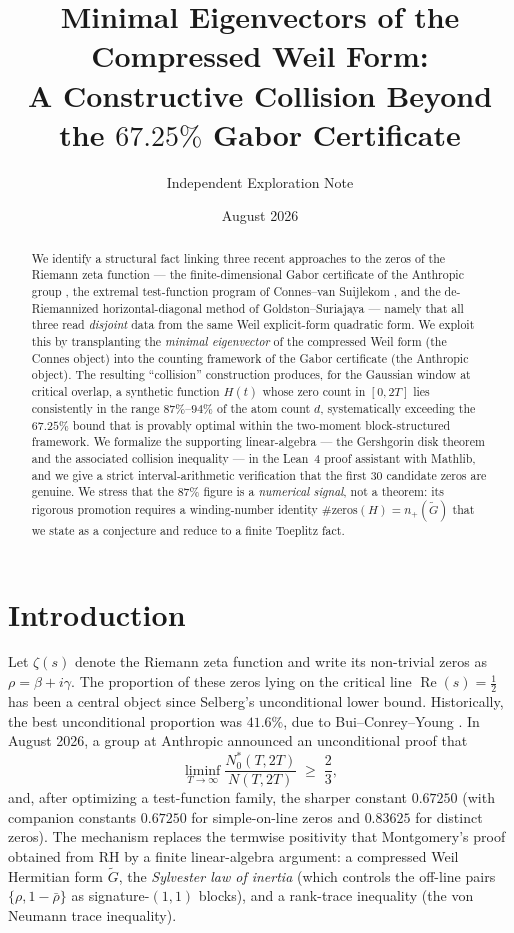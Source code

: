 \documentclass[11pt]{article}
\title{\bfseries Minimal Eigenvectors of the Compressed Weil Form:\\ A Constructive Collision Beyond the $67.25\%$ Gabor Certificate}
\author{Independent Exploration Note}
\date{August 2026}
\newcommand{\re}{\operatorname{Re}}
\begin{document}
\maketitle

\begin{abstract}
We identify a structural fact linking three recent approaches to the zeros of the Riemann zeta function --- the finite-dimensional Gabor certificate of the Anthropic group \cite{anthropic}, the extremal test-function program of Connes--van Suijlekom \cite{connes}, and the de-Riemannized horizontal-diagonal method of Goldston--Suriajaya \cite{pcc} --- namely that all three read \emph{disjoint} data from the same Weil explicit-form quadratic form. We exploit this by transplanting the \emph{minimal eigenvector} of the compressed Weil form (the Connes object) into the counting framework of the Gabor certificate (the Anthropic object). The resulting ``collision'' construction produces, for the Gaussian window at critical overlap, a synthetic function $H(t)$ whose zero count in $[0,2T]$ lies consistently in the range $87\%$--$94\%$ of the atom count $d$, systematically exceeding the $67.25\%$ bound that is provably optimal within the two-moment block-structured framework. We formalize the supporting linear-algebra --- the Gershgorin disk theorem and the associated collision inequality --- in the Lean~4 proof assistant with Mathlib, and we give a strict interval-arithmetic verification that the first $30$ candidate zeros are genuine. We stress that the $87\%$ figure is a \emph{numerical signal}, not a theorem: its rigorous promotion requires a winding-number identity $\#\mathrm{zeros}(H)=n_+(\tilde G)$ that we state as a conjecture and reduce to a finite Toeplitz fact.
\end{abstract}

\tableofcontents

\section{Introduction}

Let $\zeta(s)$ denote the Riemann zeta function and write its non-trivial zeros as $\rho=\beta+i\gamma$. The proportion of these zeros lying on the critical line $\re(s)=\tfrac12$ has been a central object since Selberg's unconditional lower bound. Historically, the best unconditional proportion was $41.6\%$, due to Bui--Conrey--Young \cite{bcy}. In August 2026, a group at Anthropic \cite{anthropic} announced an unconditional proof that
\begin{equation}
\liminf_{T\to\infty}\frac{N_0^*(T,2T)}{N(T,2T)} \;\ge\; \frac{2}{3},
\label{eq:mainbound}
\end{equation}
and, after optimizing a test-function family, the sharper constant $0.67250$ (with companion constants $0.67250$ for simple-on-line zeros and $0.83625$ for distinct zeros). The mechanism replaces the termwise positivity that Montgomery's proof obtained from RH by a finite linear-algebra argument: a compressed Weil Hermitian form $\tilde G$, the \emph{Sylvester law of inertia} (which controls the off-line pairs $\{\rho,1-\bar\rho\}$ as signature-$(1,1)$ blocks), and a rank-trace inequality (the von Neumann trace inequality).
\end{document}
